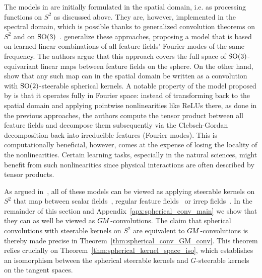 The models in \cite{Cohen2018-S2CNN,esteves2018zonalSpherical,esteves2020spinweighted} are initially formulated in the spatial domain, i.e. as processing functions on $S^2$ as discussed above.
They are, however, implemented in the spectral domain, which is possible thanks to generalized convolution theorems on $S^2$ and on $\operatorname{SO}(3)$~\cite{makadia2006rotation,Kondor2018-GENERAL,vilenkin2013representation}.
\citet{kondor2018ClebschGordan} generalize these approaches, proposing a model that is based on learned linear combinations of all feature fields' Fourier modes of the same frequency.
The authors argue that this approach covers the full space of $\operatorname{SO}(3)$-equivariant linear maps between feature fields on the sphere.
On the other hand, \citet{Cohen2019-generaltheory} show that any such map can in the spatial domain be written as a convolution with $\operatorname{SO}(2)$-steerable spherical kernels.
A notable property of the model proposed by \citet{kondor2018ClebschGordan} is that it operates fully in Fourier space:
instead of transforming back to the spatial domain and applying pointwise nonlinearities like ReLUs there, as done in the previous approaches, the authors compute the tensor product between all feature fields and decompose them subsequently via the Clebsch-Gordan decomposition back into irreducible features (Fourier modes).
This is computationally beneficial, however, comes at the expense of losing the locality of the nonlinearities.
Certain learning tasks, especially in the natural sciences, might benefit from such nonlinearities since physical interactions are often described by tensor products.


As argued in~\cite{Cohen2019-generaltheory,Cohen2018-intertwiners}, all of these models can be viewed as applying steerable kernels on $S^2$ that map between scalar fields~\cite{esteves2018zonalSpherical}, regular feature fields~\cite{Cohen2018-S2CNN} or irrep fields~\cite{esteves2020spinweighted,kondor2018ClebschGordan}.
In the remainder of this section and Appendix~\ref{apx:spherical_conv_main} we show that they can as well be viewed as $G\mkern-1.4muM$-convolutions.
The claim that spherical convolutions with steerable kernels on $S^2$ are equivalent to $G\mkern-1.4muM$-convolutions is thereby made precise in Theorem~\ref{thm:spherical_conv_GM_conv}.
This theorem relies crucially on Theorem~\ref{thm:spherical_kernel_space_iso}, which establishes an isomorphism between the spherical steerable kernels and $G$-steerable kernels on the tangent spaces.

